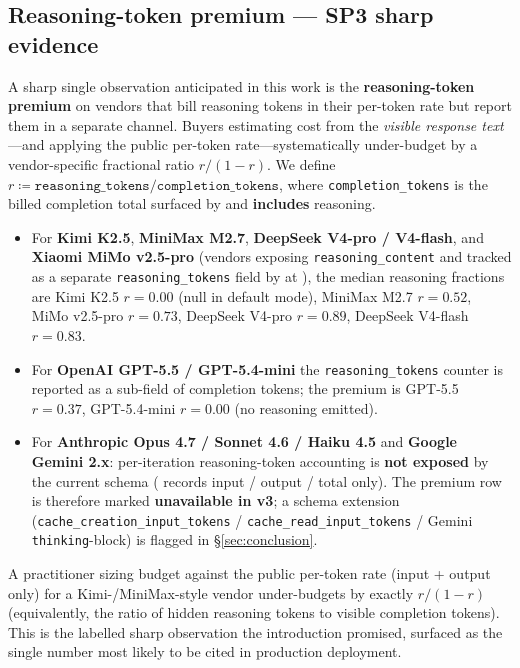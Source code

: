 \subsection{Reasoning-token premium --- SP3 sharp evidence}
\label{sec:results-premium}

A sharp single observation anticipated in this work is the
\textbf{reasoning-token premium} on vendors that bill reasoning
tokens in their per-token rate but report them in a separate
channel. Buyers estimating cost from the \emph{visible response
text}---and applying the public per-token rate---systematically
under-budget by a vendor-specific fractional ratio
$r/(1-r)$. We define
$r \coloneqq \texttt{reasoning\_tokens} / \texttt{completion\_tokens}$,
where \texttt{completion\_tokens} is the billed completion total
surfaced by  and \textbf{includes}
reasoning.

\begin{itemize}
  \item For \textbf{Kimi K2.5}, \textbf{MiniMax M2.7},
    \textbf{DeepSeek V4-pro / V4-flash}, and \textbf{Xiaomi MiMo
    v2.5-pro} (vendors exposing \texttt{reasoning\_content} and
    tracked as a separate \texttt{reasoning\_tokens} field by
     at
    ), the median reasoning
    fractions are Kimi K2.5 $r = 0.00$ (null in default mode),
    MiniMax M2.7 $r = 0.52$, MiMo v2.5-pro $r = 0.73$, DeepSeek
    V4-pro $r = 0.89$, DeepSeek V4-flash $r = 0.83$.

  \item For \textbf{OpenAI GPT-5.5 / GPT-5.4-mini} the
    \texttt{reasoning\_tokens} counter is reported as a sub-field
    of completion tokens; the premium is GPT-5.5 $r = 0.37$,
    GPT-5.4-mini $r = 0.00$ (no reasoning emitted).

  \item For \textbf{Anthropic Opus 4.7 / Sonnet 4.6 / Haiku 4.5}
    and \textbf{Google Gemini 2.x}: per-iteration reasoning-token
    accounting is \textbf{not exposed} by the current
     schema
    ( records input / output /
    total only). The premium row is therefore marked
    \textbf{unavailable in v3}; a schema extension
    (\texttt{cache\_creation\_input\_tokens} /
    \texttt{cache\_read\_input\_tokens} / Gemini
    \texttt{thinking}-block) is flagged in \S\ref{sec:conclusion}.
\end{itemize}

A practitioner sizing budget against the public per-token rate
(input + output only) for a Kimi-/MiniMax-style vendor under-budgets
by exactly $r/(1-r)$ (equivalently, the ratio of hidden reasoning
tokens to visible completion tokens). This is the labelled sharp
observation the
introduction promised, surfaced as the single number most likely to
be cited in production deployment.

